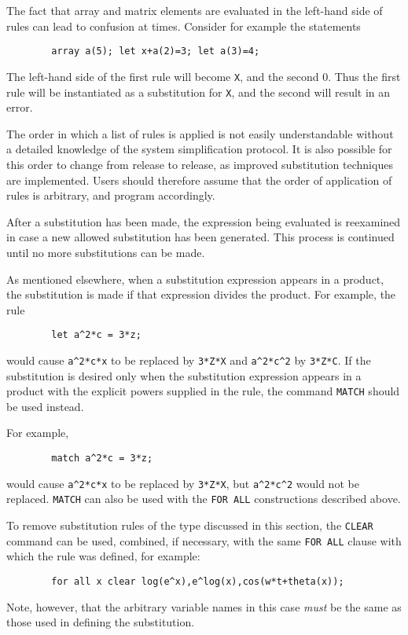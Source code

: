 The fact that array and matrix elements are evaluated in the left-hand side
of rules can lead to confusion at times. Consider for example the
statements
\begin{verbatim}
        array a(5); let x+a(2)=3; let a(3)=4;
\end{verbatim}
The left-hand side of the first rule will become {\tt X}, and the second
0.  Thus the first rule will be instantiated as a substitution for
{\tt X}, and the second will result in an error.

The order in which a list of rules is applied is not easily understandable
without a detailed knowledge of the system simplification protocol. It is
also possible for this order to change from release to release, as improved
substitution techniques are implemented. Users should therefore assume
that the order of application of rules is arbitrary, and program
accordingly.

After a substitution has been made, the expression being evaluated is
reexamined in case a new allowed substitution has been generated. This
process is continued until no more substitutions can be made.

As mentioned elsewhere, when a substitution expression appears in a
product, the substitution is made if that expression divides the product.
For example, the rule
\begin{verbatim}
        let a^2*c = 3*z;
\end{verbatim}
would cause {\tt a\verb|^|2*c*x} to be replaced by {\tt 3*Z*X} and
{\tt a\verb|^|2*c\verb|^|2} by {\tt 3*Z*C}.  If the substitution is desired only
when the substitution expression appears in a product with the explicit
powers supplied in the rule, the command {\tt MATCH} should be used
instead.

For example,
\begin{verbatim}
        match a^2*c = 3*z;
\end{verbatim}
would cause {\tt a\verb|^|2*c*x} to be replaced by {\tt 3*Z*X}, but
{\tt a\verb|^|2*c\verb|^|2} would not be replaced. {\tt MATCH} can also be used
with the {\tt FOR ALL} constructions described above.

To remove substitution rules of the type discussed in this section, the
{\tt CLEAR} command can be used, combined, if necessary,
with the same {\tt FOR ALL} clause with which the rule was defined, for
example:
\begin{verbatim}
        for all x clear log(e^x),e^log(x),cos(w*t+theta(x));
\end{verbatim}
Note, however, that the arbitrary variable names in this case {\em must\/}
be the same as those used in defining the substitution.

